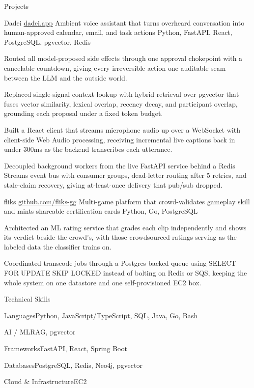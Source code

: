 \documentclass[
	11pt
]{../../../template}
\begin{document}
	\begin{rSection}{P}{rojects}
		\begin{rSectionEntry}
			{Dadei}
			{\href{https://dadei.app}{dadei.app}}
			{Ambient voice assistant that turns overheard conversation into human-approved calendar, email, and task actions}
			{Python, FastAPI, React, PostgreSQL, pgvector, Redis}
			{}

			\item Routed all model-proposed side effects through one approval chokepoint with a cancelable countdown, giving every irreversible action one auditable seam between the LLM and the outside world.
			\item Replaced single-signal context lookup with hybrid retrieval over pgvector that fuses vector similarity, lexical overlap, recency decay, and participant overlap, grounding each proposal under a fixed token budget.
			\item Built a React client that streams microphone audio up over a WebSocket with client-side Web Audio processing, receiving incremental live captions back in under 300ms as the backend transcribes each utterance.
			\item Decoupled background workers from the live FastAPI service behind a Redis Streams event bus with consumer groups, dead-letter routing after 5 retries, and stale-claim recovery, giving at-least-once delivery that pub/sub dropped.
		\end{rSectionEntry}

		\begin{rSectionEntry}
			{fliks}
			{\href{https://github.com/fliks-gg}{github.com/fliks-gg}}
			{Multi-game platform that crowd-validates gameplay skill and mints shareable certification cards}
			{Python, Go, PostgreSQL}
			{}

			\item Architected an ML rating service that grades each clip independently and shows its verdict beside the crowd's, with those crowdsourced ratings serving as the labeled data the classifier trains on.
			\item Coordinated transcode jobs through a Postgres-backed queue using SELECT FOR UPDATE SKIP LOCKED instead of bolting on Redis or SQS, keeping the whole system on one datastore and one self-provisioned EC2 box.
		\end{rSectionEntry}
	\end{rSection}

	\begin{rSection}{T}{echnical Skills}
		\begin{rSet}{Languages}{Python, JavaScript/TypeScript, SQL, Java, Go, Bash}
		\end{rSet}
		\begin{rSet}{AI / ML}{RAG, pgvector}
		\end{rSet}
		\begin{rSet}{Frameworks}{FastAPI, React, Spring Boot}
		\end{rSet}
		\begin{rSet}{Databases}{PostgreSQL, Redis, Neo4j, pgvector}
		\end{rSet}
		\begin{rSet}{Cloud \& Infrastructure}{EC2}
		\end{rSet}
	\end{rSection}
\end{document}
